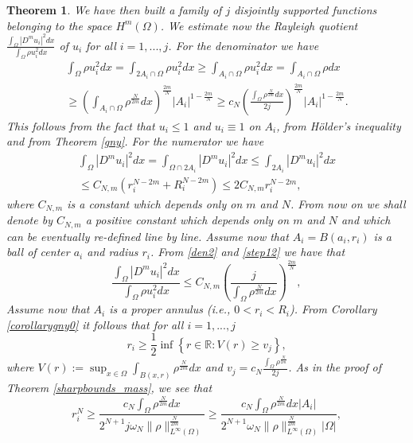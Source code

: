 \documentclass[11pt,a4paper]{amsart}
\numberwithin{equation}{section}
\newtheorem{thm}[equation]{Theorem}
\begin{document}
\begin{thm}
We have then built a family of $j$ disjointly supported functions belonging to the space $H^m(\Omega)$. We estimate now the Rayleigh quotient $\frac{\int_{\Omega}|D^mu_i|^2dx}{\int_{\Omega}\rho u_i^2dx}$ of $u_i$ for all $i=1,...,j$. For the denominator we have
\begin{multline}\label{den2}
\int_{\Omega}\rho u_i^2dx=\int_{2A_i\cap\Omega}\rho u_i^2dx\geq\int_{A_i\cap\Omega}\rho u_i^2dx=\int_{A_i\cap\Omega}\rho dx\\
\geq \left(\int_{A_i\cap\Omega}\rho^{\frac{N}{2m}}dx\right)^{\frac{2m}{N}}|A_i|^{1-\frac{2m}{N}}\geq c_N\left(\frac{\int_{\Omega}\rho^{\frac{N}{2m}} dx}{2j}\right)^{\frac{2m}{N}}|A_i|^{1-\frac{2m}{N}}.
\end{multline}
This follows from the fact that $u_i\leq 1$ and $u_i\equiv 1$ on $A_i$, from H\"older's inequality and from Theorem \ref{gny}. For the numerator we have
\begin{multline}\label{step12}
\int_{\Omega}|D^mu_i|^2dx=\int_{\Omega\cap 2A_i}|D^mu_i|^2dx\leq\int_{2A_i}|D^mu_i|^2dx\\
\leq C_{N,m} (r_i^{N-2m}+R_i^{N-2m})\leq 2C_{N,m} r_i^{N-2m},
\end{multline}
where $C_{N,m}$ is a constant which depends only on $m$ and $N$. From now on we shall denote by $C_{N,m}$ a positive constant which depends only on $m$ and $N$ and which can be eventually re-defined line by line. Assume now that $A_i=B(a_i,r_i)$ is a ball of center $a_i$ and radius $r_i$. From \eqref{den2} and \eqref{step12} we have that 
\begin{equation}\label{rayball}
\frac{\int_{\Omega}|D^mu_i|^2dx}{\int_{\Omega}\rho u_i^2 dx}\leq C_{N,m}\left(\frac{j}{\int_{\Omega}\rho^{\frac{N}{2m}}dx}\right)^{\frac{2m}{N}},
\end{equation}
Assume now that $A_i$ is a proper annulus (i.e., $0<r_i<R_i$). From Corollary \ref{corollarygny0} it follows that for all $i=1,...,j$
$$
r_i\geq\frac{1}{2}\inf\left\{r\in\mathbb R:V(r)\geq v_j\right\},
$$
where $V(r):=\sup_{x\in\Omega}\int_{B(x,r)}\rho^{\frac{N}{2m}} dx$ and $v_j=c_N\frac{\int_{\Omega}\rho^{\frac{N}{2m}}}{2j}$. As in the proof of Theorem \ref{sharpbounds_mass}, we see that 
\begin{equation}\label{radius_weyl_estimate}
r_i^N\geq\frac{c_N\int_{\Omega}\rho^{\frac{N}{2m}}dx}{2^{N+1}j\omega_N\|\rho\|_{L^{\infty}(\Omega)}^{\frac{N}{2m}}}\geq\frac{c_N\int_{\Omega}\rho^{\frac{N}{2m}}dx|A_i|}{2^{N+1}\omega_N\|\rho\|_{L^{\infty}(\Omega)}^{\frac{N}{2m}}|\Omega|},

\end{equation}
\end{thm}
\end{document}
